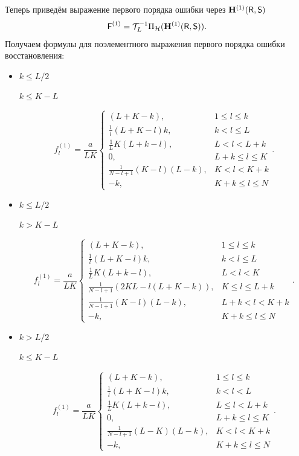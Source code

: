 \documentclass[specialist,
               substylefile = spbu.rtx,
               subf,href,colorlinks=true, 12pt]{disser}
\begin{document}
Теперь приведём выражение первого порядка ошибки через $\mathbf{H}^{(1)}(\textsf{R}, \textsf{S})$
$$\textsf{F}^{(1)} = \mathcal{T}_L^{-1} \Pi_{\mathcal{H}}(\mathbf{H}^{(1)}(\textsf{R}, \textsf{S})).$$
Получаем формулы для поэлементного выражения первого порядка ошибки восстановления:
\begin{itemize}
\item
$k \leq L/2$

$k \leq K - L$

$$f^{(1)}_l = \frac{a}{{LK}}
\begin{cases}
	(L + K - k), & \text{$1 \leq l \leq k$}\\
	\frac{1}{l}(L + K - l)k, & \text{$k < l \leq L$}\\
	\frac{1}{L}K(L + k - l), &\text{$L < l < L + k$}\\
	0, &\text{$L + k \leq l \leq K$}\\
	\frac{1}{N - l + 1}(K - l)(L - k), &\text{$K < l < K + k$}\\
	-k, &\text{$K + k \leq l \leq N $}
\end{cases}.
$$

\item
$k \leq L/2$

$k > K - L$

$$f^{(1)}_l = \frac{a}{{LK}}
\begin{cases}
	(L + K - k), & \text{$1 \leq l \leq k$}\\
	\frac{1}{l}(L + K - l)k, & \text{$k < l \leq L$}\\
	\frac{1}{L}K(L + k- l), &\text{$L < l < K$}\\
	\frac{1}{N - l + 1}(2KL - l(L + K - k)), &\text{$K \leq l \leq L + k$}\\
	\frac{1}{N - l + 1}( K - l)(L - k), &\text{$L + k < l < K + k$}\\
	-k, &\text{$K + k \leq l \leq N$}
\end{cases}.
$$

\item
$k > L/2$

$k \leq K - L$

$$f^{(1)}_l = \frac{a}{{LK}}
\begin{cases}
	(L + K - k), & \text{$1 \leq l \leq k$}\\
	\frac{1}{l}(L + K - l)k, & \text{$k < l < L$}\\
	\frac{1}{L}K(L + k - l), &\text{$L \leq l < L + k$}\\
	0, &\text{$L + k \leq l \leq K$}\\
	\frac{1}{N - l + 1}(L - K)(L - k), &\text{$K < l < K + k$}\\
	-k, &\text{$K + k \leq l \leq N$}
\end{cases}.
$$


\end{itemize}
\end{document}
